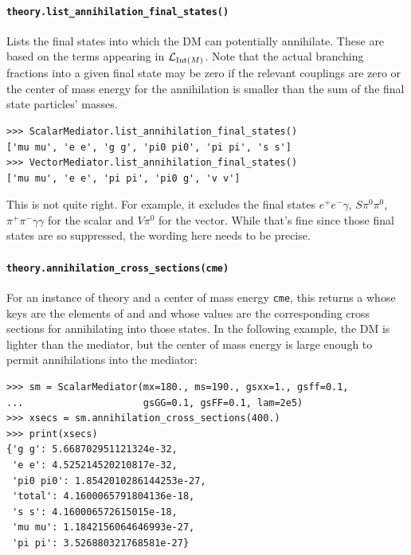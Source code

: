 \paragraph{\texttt{theory.list\_annihilation\_final\_states()}} Lists the final states into which the DM can potentially annihilate. These are based on the terms appearing in $\mathcal{L}_{{\mathrm{Int}}(M)}$. Note that the actual branching fractions into a given final state may be zero if the relevant couplings are zero or the center of mass energy for the annihilation is smaller than the sum of the final state particles' masses. 
\begin{verbatim}
>>> ScalarMediator.list_annihilation_final_states()
['mu mu', 'e e', 'g g', 'pi0 pi0', 'pi pi', 's s']
>>> VectorMediator.list_annihilation_final_states()
['mu mu', 'e e', 'pi pi', 'pi0 g', 'v v']
\end{verbatim}
{\color{red} This is not quite right. For example, it excludes the final states $e^+ e^- \gamma$, $S \pi^0 \pi^0$, $\pi^+ \pi^- \gamma \gamma$ for the scalar and $V \pi^0$ for the vector. While that's fine since those final states are so suppressed, the wording here needs to be precise.}

\paragraph{\texttt{theory.annihilation\_cross\_sections(cme)}} For an instance  of theory and a center of mass energy \texttt{cme}, this returns a  whose keys are the elements of  and  and whose values are the corresponding cross sections for annihilating into those states. In the following example, the DM is lighter than the mediator, but the center of mass energy is large enough to permit annihilations into the mediator:
\begin{verbatim}
>>> sm = ScalarMediator(mx=180., ms=190., gsxx=1., gsff=0.1,
...                     gsGG=0.1, gsFF=0.1, lam=2e5)
>>> xsecs = sm.annihilation_cross_sections(400.)
>>> print(xsecs)
{'g g': 5.668702951121324e-32,
 'e e': 4.525214520210817e-32,
 'pi0 pi0': 1.8542010286144253e-27,
 'total': 4.1600065791804136e-18,
 's s': 4.160006572615015e-18,
 'mu mu': 1.1842156064646993e-27,
 'pi pi': 3.526880321768581e-27}
\end{verbatim}

